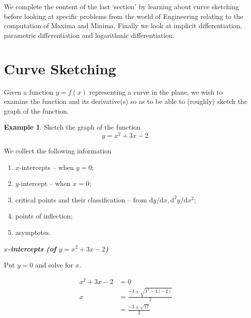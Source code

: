 \documentclass[
  english,
  11pt,
  oneside]{book}
\providecommand{\tightlist}{%
  \setlength{\itemsep}{0pt}\setlength{\parskip}{0pt}}
\newcommand{\slide}{}
\theoremstyle{definition}
\theoremstyle{definition}
\newtheorem{example}{Example}[chapter]
\theoremstyle{definition}
\theoremstyle{definition}
\theoremstyle{remark}
\begin{document}
We complete the content of the last `section' by learning about curve sketching before looking at specific problems from the world of Engineering relating to the computation of Maxima and Minima. Finally we look at implicit differentiation, parametric differentiation and logarithmic differentiation.

\slide

\section{Curve Sketching}\label{curve-sketching}

Given a function \(y=f(x)\) representing a curve in the plane, we wish to examine the function and its derivative(s) so as to be able to (roughly) sketch the graph of the function.

\begin{example}
Sketch the graph of the function
\[
y = x^2+3x-2.
\]
\end{example}

We collect the following information

\begin{enumerate}
\def\labelenumi{\arabic{enumi}.}
\tightlist
\item
  \(x\)-intercepts -- when \(y=0\);
\item
  \(y\)-intercept -- when \(x = 0\);
\item
  critical points and their classification -- from \(\mathrm{d}y/\mathrm{d} x, \mathrm{d}^2y/\mathrm{d}x^2\);
\item
  points of inflection;
\item
  asymptotes.
\end{enumerate}

\slide

\textbf{\emph{\(x\)-intercepts (of \(y = x^2+3x-2\))}}

Put \(y=0\) and solve for \(x\).

\begin{notslides}

\begin{align*}
x^2+3x-2 &= 0\\
x &= \frac{-3\pm\sqrt{3^2-4(-2)}}{2}\\
&=\frac{-3\pm\sqrt{17}}{2}
\end{align*}

\end{notslides}

\begin{slidesonly}

\vfill

\end{slidesonly}
\end{document}
